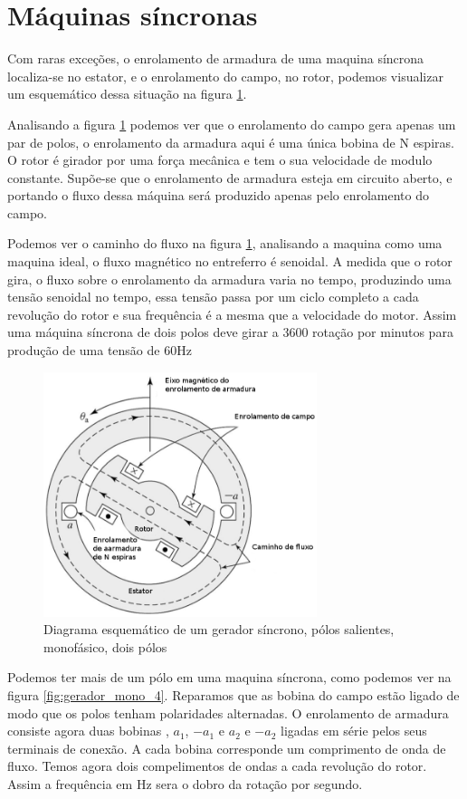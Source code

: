\documentclass[
	12pt,				%
	openright,			%
	twoside,			%
	a4paper,			%
	english,			%
	french,				%
	spanish,			%
	brazil,				%
	]{abntex2}
\begin{document}
\section{Máquinas síncronas}

Com raras exceções, o enrolamento de armadura de uma maquina síncrona localiza-se no estator, e o enrolamento do campo, no rotor, podemos visualizar um esquemático dessa situação na figura \ref{fig:gerador}.

Analisando a figura \ref{fig:gerador} podemos ver que o enrolamento do campo gera apenas um par de polos, o enrolamento da armadura aqui é uma única bobina de N espiras. O rotor é girador por uma força mecânica e tem o sua velocidade de modulo constante. Supõe-se que o enrolamento de armadura esteja em circuito aberto, e portando o fluxo dessa máquina será produzido apenas pelo enrolamento do campo.

Podemos ver o caminho do fluxo na figura \ref{fig:gerador}, analisando a maquina como uma maquina ideal, o fluxo magnético no entreferro é senoidal. A medida que o rotor gira, o fluxo sobre o enrolamento da armadura varia no tempo, produzindo uma tensão senoidal no tempo, essa tensão passa por um ciclo completo a cada revolução do rotor e sua frequência é a mesma que a velocidade do motor. Assim uma máquina síncrona de dois polos deve girar a 3600 rotação por minutos para produção de uma tensão de 60Hz
\begin{figure}[H]
    \centering
    \includegraphics[width=8cm]{img/gerador.png}
    \caption{Diagrama esquemático de um gerador síncrono, pólos salientes, monofásico, dois pólos}
    \label{fig:gerador}
\end{figure}

Podemos ter mais de um pólo em uma maquina síncrona, como podemos ver na figura \ref{fig:gerador_mono_4}. Reparamos que as bobina do campo estão ligado de modo que os polos tenham polaridades alternadas. O enrolamento de armadura consiste agora duas bobinas , $a_{1}$, $-a_{1}$ e $a_{2}$ e $-a_{2}$ ligadas em série pelos seus terminais de conexão. A cada bobina corresponde um comprimento de onda de fluxo. Temos agora dois compelimentos de ondas a cada revolução do rotor. Assim a frequência em Hz sera o dobro da rotação por segundo.
\end{document}
